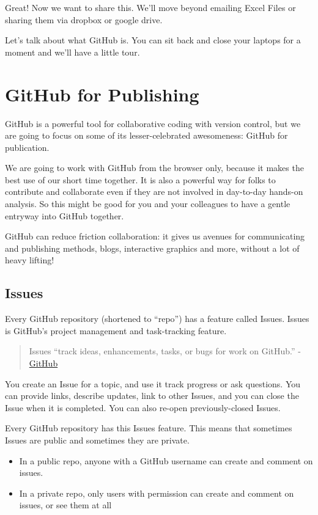 \documentclass[]{book}
\providecommand{\tightlist}{%
  \setlength{\itemsep}{0pt}\setlength{\parskip}{0pt}}
\begin{document}
Great! Now we want to share this. We'll move beyond emailing Excel Files or sharing them via dropbox or google drive.

Let's talk about what GitHub is. You can sit back and close your laptops for a moment and we'll have a little tour.

\hypertarget{github-for-publishing}{%
\section{GitHub for Publishing}\label{github-for-publishing}}

GitHub is a powerful tool for collaborative coding with version control, but we are going to focus on some of its lesser-celebrated awesomeness: GitHub for publication.

We are going to work with GitHub from the browser only, because it makes the best use of our short time together. It is also a powerful way for folks to contribute and collaborate even if they are not involved in day-to-day hands-on analysis. So this might be good for you and your colleagues to have a gentle entryway into GitHub together.

GitHub can reduce friction collaboration: it gives us avenues for communicating and publishing methods, blogs, interactive graphics and more, without a lot of heavy lifting!

\hypertarget{issues}{%
\subsection{Issues}\label{issues}}

Every GitHub repository (shortened to ``repo'') has a feature called Issues. Issues is GitHub's project management and task-tracking feature.

\begin{quote}
Issues ``track ideas, enhancements, tasks, or bugs for work on GitHub.'' - \href{https://help.github.com/en/articles/about-issues}{GitHub}
\end{quote}

You create an Issue for a topic, and use it track progress or ask questions. You can provide links, describe updates, link to other Issues, and you can close the Issue when it is completed. You can also re-open previously-closed Issues.

Every GitHub repository has this Issues feature. This means that sometimes Issues are public and sometimes they are private.

\begin{itemize}
\tightlist
\item
  In a public repo, anyone with a GitHub username can create and comment on issues.
\item
  In a private repo, only users with permission can create and comment on issues, or see them at all
\end{itemize}
\end{document}
